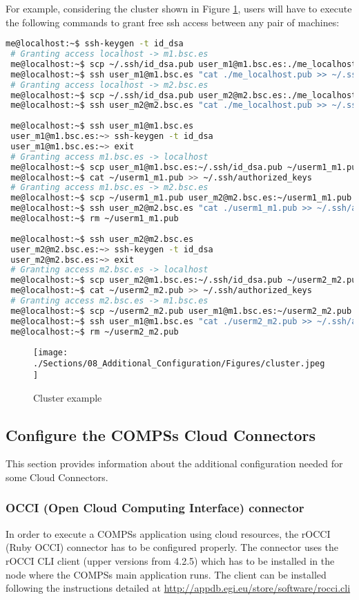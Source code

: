 For example, considering the cluster shown in Figure \ref{fig:cluster}, users will have to execute the following commands
to grant free ssh access between any pair of machines:
\begin{lstlisting}[language=bash]
 me@localhost:~$ ssh-keygen -t id_dsa
 # Granting access localhost -> m1.bsc.es
 me@localhost:~$ scp ~/.ssh/id_dsa.pub user_m1@m1.bsc.es:./me_localhost.pub
 me@localhost:~$ ssh user_m1@m1.bsc.es "cat ./me_localhost.pub >> ~/.ssh/authorized_keys; rm ./me_localhost.pub"
 # Granting access localhost -> m2.bsc.es
 me@localhost:~$ scp ~/.ssh/id_dsa.pub user_m2@m2.bsc.es:./me_localhost.pub
 me@localhost:~$ ssh user_m2@m2.bsc.es "cat ./me_localhost.pub >> ~/.ssh/authorized_keys; rm ./me_localhost.pub"
 
 me@localhost:~$ ssh user_m1@m1.bsc.es
 user_m1@m1.bsc.es:~> ssh-keygen -t id_dsa
 user_m1@m1.bsc.es:~> exit
 # Granting access m1.bsc.es -> localhost
 me@localhost:~$ scp user_m1@m1.bsc.es:~/.ssh/id_dsa.pub ~/userm1_m1.pub
 me@localhost:~$ cat ~/userm1_m1.pub >> ~/.ssh/authorized_keys
 # Granting access m1.bsc.es -> m2.bsc.es
 me@localhost:~$ scp ~/userm1_m1.pub user_m2@m2.bsc.es:~/userm1_m1.pub 
 me@localhost:~$ ssh user_m2@m2.bsc.es "cat ./userm1_m1.pub >> ~/.ssh/authorized_keys; rm ./userm1_m1.pub"
 me@localhost:~$ rm ~/userm1_m1.pub
 
 me@localhost:~$ ssh user_m2@m2.bsc.es
 user_m2@m2.bsc.es:~> ssh-keygen -t id_dsa
 user_m2@m2.bsc.es:~> exit
 # Granting access m2.bsc.es -> localhost
 me@localhost:~$ scp user_m2@m1.bsc.es:~/.ssh/id_dsa.pub ~/userm2_m2.pub
 me@localhost:~$ cat ~/userm2_m2.pub >> ~/.ssh/authorized_keys
 # Granting access m2.bsc.es -> m1.bsc.es
 me@localhost:~$ scp ~/userm2_m2.pub user_m1@m1.bsc.es:~/userm2_m2.pub 
 me@localhost:~$ ssh user_m1@m1.bsc.es "cat ./userm2_m2.pub >> ~/.ssh/authorized_keys; rm ./userm2_m2.pub"
 me@localhost:~$ rm ~/userm2_m2.pub
\end{lstlisting}

\begin{figure}[h!]
  \centering
    \texttt{[image: ./Sections/08\_Additional\_Configuration/Figures/cluster.jpeg]}
    \caption{Cluster example}
    \label{fig:cluster}
\end{figure}

\subsection{Configure the COMPSs Cloud Connectors}
This section provides information about the additional configuration needed for some Cloud Connectors.

\subsubsection{OCCI (Open Cloud Computing Interface) connector}
In order to execute a COMPSs application using cloud resources, the rOCCI (Ruby OCCI) connector has to be configured properly.
The connector uses the rOCCI CLI client (upper versions from 4.2.5) which has to be installed in the node where the COMPSs main
application runs. The client can be installed following the instructions detailed at 
\url{http://appdb.egi.eu/store/software/rocci.cli}